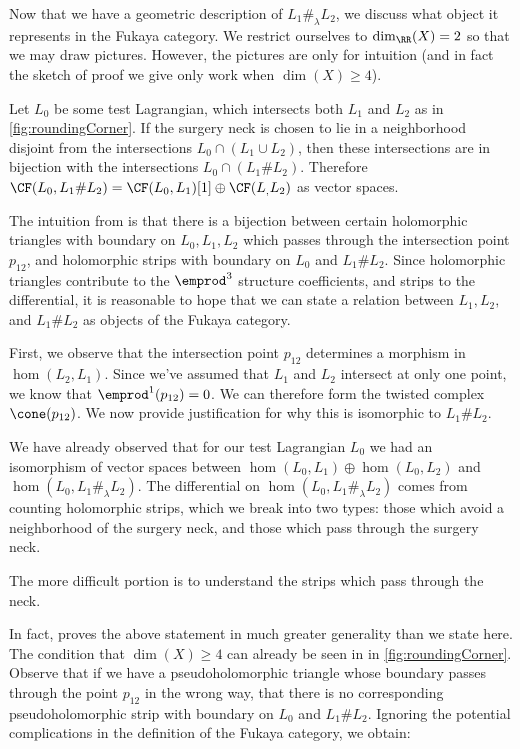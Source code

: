 


Now that we have a geometric description of $L_1\#_\lambda L_2$, we discuss what object it represents in the Fukaya category. We restrict ourselves to $\dim_\RR(X)=2$ so that we may draw pictures. However, the pictures are only for intuition (and in fact the sketch of proof we give only work when $\dim(X)\geq 4$).

Let $L_0$ be some test Lagrangian, which intersects both $L_1$ and $L_2$ as in \cref{fig:roundingCorner}. If the surgery neck is chosen to lie in a neighborhood disjoint from the intersections  $L_0\cap (L_1\cup L_2)$, then these intersections are in bijection with the intersections $L_0\cap (L_1\# L_2)$. Therefore $\CF(L_0, L_1\# L_2)=\CF(L_0, L_1)[1]\oplus \CF(L_, L_2)$ as vector spaces.

 The intuition from \cite{fukaya2007lagrangian} is that there is a bijection between certain holomorphic triangles with boundary on $L_0, L_1, L_2$ which passes through the intersection point $p_{12}$, and holomorphic strips with boundary on $L_0$ and $L_1\# L_2$. Since holomorphic triangles contribute to the $\emprod^3$ structure coefficients, and strips to the differential, it is reasonable to hope that we can state a relation between $L_1, L_2,$ and $L_1\#L_2$ as objects of the Fukaya category.


First, we observe that the intersection point $p_{12}$ determines a morphism in $\hom(L_2, L_1)$. Since we've assumed that $L_1$ and $L_2$ intersect at only one point, we know that $\emprod^1(p_{12})=0$. We can therefore form the twisted complex $\cone(p_{12})$. We now provide justification for why this is isomorphic to $L_1\# L_2$.

We have already observed that for our test Lagrangian $L_0$ we had an isomorphism of vector spaces between $\hom(L_0, L_1)\oplus \hom(L_0, L_2)$ and $\hom(L_0, L_1\#_\lambda L_2)$. The differential on $\hom(L_0, L_1\#_\lambda L_2)$ comes from counting holomorphic strips, which we break into two types: those which avoid a neighborhood of the surgery neck, and those which pass through the surgery neck. 

The more difficult portion is to understand the strips which pass through the neck.

In fact, \cite{fukaya2007lagrangian} proves the above statement in much greater generality than we state here. The condition that $\dim(X)\geq 4$ can already be seen in in \cref{fig:roundingCorner}. Observe that if we have a pseudoholomorphic triangle whose boundary passes through the point $p_{12}$ in the wrong way, that there is no corresponding pseudoholomorphic strip with boundary on $L_0$ and $L_1\# L_2$.
Ignoring the potential complications in the definition of the Fukaya category, we obtain:


